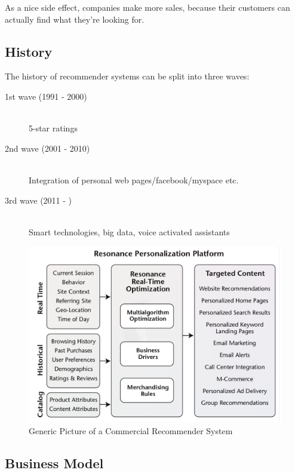 \documentclass[11pt]{article}
\begin{document}
As a nice side effect, companies make more sales, because their customers can actually find what they're looking for.

\subsection{History}

The history of recommender systems can be split into three waves:

\begin{description}
    \item[1st wave (1991 - 2000)] \mbox{}\\
          5-star ratings
    \item[2nd wave (2001 - 2010)] \mbox{}\\
          Integration of personal web pages/facebook/myspace etc.
    \item[3rd wave (2011 - )] \mbox{} \\
          Smart technologies, big data, voice activated assistants
\end{description}

\begin{figure}[htb!]
    \centering
    \includegraphics[keepaspectratio=true,height=15\baselineskip]{recommender_system.png}
    \caption{Generic Picture of a Commercial Recommender System}
    \label{fig:recommender_systems}
\end{figure}


\subsection{Business Model}
\end{document}
